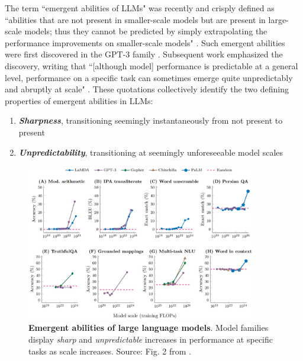 The term ``emergent abilities of LLMs" was recently and crisply defined as ``abilities that are not present in smaller-scale models but are present in large-scale models; thus they cannot be predicted by simply extrapolating the performance improvements on smaller-scale models" \cite{wei2022emergent}.
Such emergent abilities were first discovered in the GPT-3 family \cite{brown2020language}.
Subsequent work emphasized the discovery, writing that ``[although model] performance is predictable at a general level, performance on a specific task can sometimes emerge quite unpredictably and abruptly at scale" \cite{ganguli2022predictability}.
These quotations collectively identify the two defining properties of emergent abilities in LLMs: 
%
\begin{enumerate}
    \item \textit{\textbf{Sharpness}}, transitioning seemingly instantaneously from not present to present
    \item \textit{\textbf{Unpredictability}}, transitioning at seemingly unforeseeable model scales
\end{enumerate}

\begin{figure}
    \centering
    \includegraphics[width=0.9\textwidth]{figures/wei_2022_emergence/wei_2022_emergence_fig2.png}
    \caption{\textbf{Emergent abilities of large language models}. Model families display \textit{sharp} and \textit{unpredictable} increases in performance at specific tasks as scale increases.
    Source: Fig. 2 from \cite{wei2022emergent}.}
    \label{fig:wei_2022_emergence_fig1}
\end{figure}

